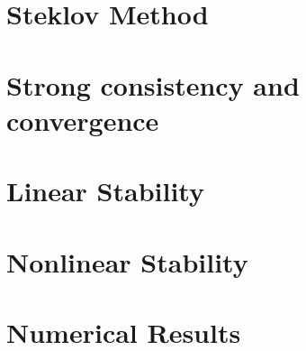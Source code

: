 	\label{paper:paperA}
		
	\section{Steklov Method}\label{sec:SteklovMethod}
		
	\section{Strong consistency and convergence}\label{sec:StrongConsistencyAndConvergence}
		
	\section{Linear Stability}\label{sec:LinearStability}
		
	\section{Nonlinear Stability} \label{sec:NonlinearStability}
		
	\section{Numerical Results}\label{sec:NumericalResults}
		